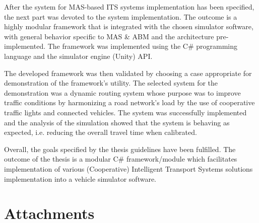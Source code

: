 \documentclass[titlepage, 12pt]{article}
\begin{document}
After the system for MAS-based ITS systems implementation has been specified, the next part was
devoted to the system implementation. The outcome is a highly modular framework that is
integrated with the chosen simulator software, with general behavior specific to MAS \& ABM 
and the architecture pre-implemented. The framework was implemented using the C\# programming 
language and the simulator engine (Unity) API. 

The developed framework was then validated by choosing a case appropriate for demonstration of
the framework's utility. The selected system for the demonstration was a dynamic routing system
whose purpose was to improve traffic conditions by harmonizing a road network's load by the use
of cooperative traffic lights and connected vehicles. The system was successfully implemented
and the analysis of the simulation showed that the system is behaving as expected, i.e.
reducing the overall travel time when calibrated.

Overall, the goals specified by the thesis guidelines have been fulfilled. The outcome of the thesis is a 
modular C\# framework/module which facilitates implementation of various (Cooperative) 
Intelligent Transport Systems solutions implementation into a vehicle simulator software. 

\clearpage

\section{Attachments}

\clearpage

\printbibliography
\end{document}
